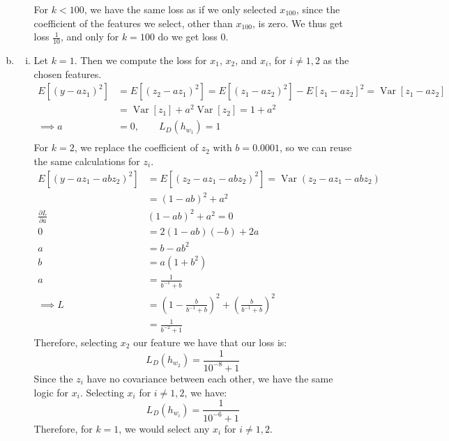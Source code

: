 \documentclass{amsart}
\DeclareMathOperator{\Var}{Var}  %
\theoremstyle{definition}
\begin{document}
\begin{enumerate}[(a)]
\begin{enumerate}[i.]
        For $k < 100$, we have the same loss as if we only selected $x_{100}$, since the coefficient of the features we select, other than $x_{100}$, is zero.
        We thus get loss $\frac{1}{10}$, and only for $k=100$ do we get loss $0$.
    \end{enumerate}
    \item
    \begin{enumerate}[i.]
      \item 
        Let $k = 1$. Then we compute the loss for $x_1$, $x_2$, and $x_i$, for $i \neq 1,2$ as the chosen features.
        \begin{align*}
          E[(y - a z_1)^2] &= E[(z_2 - a z_1)^2] = E[(z_1 - a z_2)^2] - E[z_1 - a z_2]^2 = \Var[z_1 - a z_2]\\
          &= \Var[z_1] + a^2 \Var[z_2] = 1 + a^2\\
          \implies a&= 0, \qquad L_D(h_{w_1}) = 1\\
        \end{align*}
        For $k=2$, we replace the coefficient of $z_2$ with $b = 0.0001$, so we can reuse the same calculations for $z_i$.
        \begin{align*}
          E[(y - a z_1 - a b z_2)^2] &= E[(z_2 - a z_1 - a b z_2)^2] = \Var(z_2 - a z_1 - a b z_2)\\
          &= (1-a b)^2 + a^2 \\
          \frac{\partial L}{\partial a} &(1-a b)^2 + a^2 = 0\\
          0 &= 2(1-ab)(-b) + 2a\\
          a &= b - ab^2\\
          b &=a (1 + b^2) \\
          a &= \frac{1}{b^{-1}+b}\\
          \implies L &= \left(1 - \frac{b}{b^{-1}+b}\right)^2 + \left(\frac{b}{b^{-1}+b}\right)^2\\
          &= \frac{1}{b^{-2} + 1}
        \end{align*}
        Therefore, selecting $x_2$ our feature we have that our loss is:
        \[L_D(h_{w_2}) = \frac{1}{10^{-8} + 1}\] 
        Since the $z_i$ have no covariance between each other, we have the same logic for $x_i$. Selecting $x_i$ for $i \neq 1,2$, we have:
        \[L_D(h_{w_i}) = \frac{1}{10^{-6} + 1}\]
        Therefore, for $k = 1$, we would select any $x_i$ for $i \neq 1,2$.


\end{enumerate}
\end{enumerate}
\end{document}
